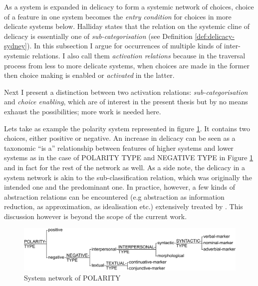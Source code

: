 As a system is expanded in delicacy to form a systemic network of choices, choice of a feature in one system becomes the \textit{entry condition} for choices in more delicate systems below. Halliday states that the relation on the systemic cline of delicacy is essentially one of \textit{sub-categorisation} (see Definition \ref{def:delicacy-sydney}). In this subsection I argue for occurrences of multiple kinds of inter-systemic relations. I also call them \textit{activation relations} because in the traversal process from less to more delicate systems, when choices are made in the former then choice making is enabled or \textit{activated} in the latter.

Next I present a distinction between two activation relations: \textit{sub-categorisation} and \textit{choice enabling}, which are of interest in the present thesis but by no means exhaust the possibilities; more work is needed here.

Lets take as example the polarity system represented in figure \ref{fig:polarity}. It contains two choices, either positive or negative. 
An increase in delicacy can be seen as a taxonomic ``is a'' relationship between features of higher systems and lower systems as in the case of POLARITY TYPE and NEGATIVE TYPE in Figure \ref{fig:polarity} and in fact for the rest of the network as well. 
As a side note, the delicacy in a system network is akin to the sub-classification relation, which was originally the intended one and the predominant one. In practice, however, a few kinds of abstraction relations can be encountered (e.g abstraction as information reduction, as approximation, as idealisation etc.) extensively treated by \citet{Saitta2013}. This discussion however is beyond the scope of the current work.

\begin{figure}[!ht]
    \centering
    \includegraphics[width=\textwidth]{Figures/SFL-grammar/polarity-system.pdf}
    \caption{System network of POLARITY}
    \label{fig:polarity}
\end{figure}

